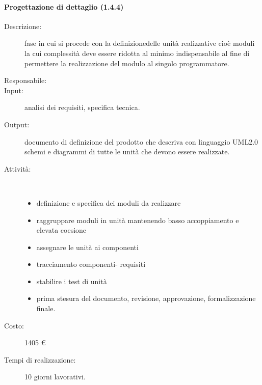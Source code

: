 \paragraph{Progettazione di dettaglio (1.4.4)}
\begin{description}
\item[Descrizione:] fase in cui si procede con la definizionedelle unit\`{a} realizzative cio\`{e} moduli la cui complessit\`{a} deve essere ridotta al minimo indispensabile al fine di permettere la realizzazione del modulo al singolo programmatore.
\item[Responsabile:] 
\item[Input:] analisi dei requisiti, specifica tecnica.
\item[Output:] documento di definizione del prodotto che descriva con linguaggio UML2.0 schemi e diagrammi di tutte le unità che devono essere realizzate.
\item[Attività:]\mbox{}\\[-1.5\baselineskip]
	\begin{itemize}
	\item definizione e specifica dei moduli da realizzare
	\item raggruppare moduli in unità mantenendo basso accoppiamento e elevata coesione
	\item assegnare le unità ai componenti
	\item tracciamento componenti- requisiti
	\item stabilire i test di unità
	\item prima stesura del documento, revisione, approvazione, formalizzazione finale.
	\end{itemize}
\item[Costo:] 1405 \euro{}
\item[Tempi di realizzazione:] 10 giorni lavorativi.
\end{description}


